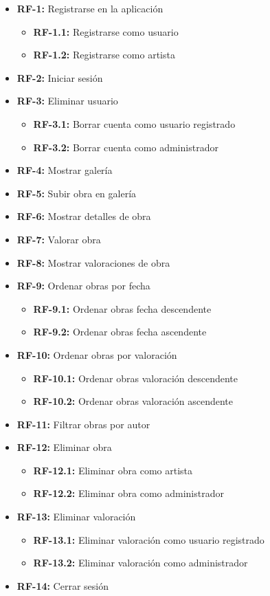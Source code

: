 \begin{itemize}
    \item \textbf{RF-1:} Registrarse en la aplicación
    \begin{itemize}
        \item \textbf{RF-1.1:} Registrarse como usuario
        \item \textbf{RF-1.2:} Registrarse como artista
    \end{itemize}
    \item \textbf{RF-2:} Iniciar sesión
    \item \textbf{RF-3:} Eliminar usuario
    \begin{itemize}
        \item \textbf{RF-3.1:} Borrar cuenta como usuario registrado
        \item \textbf{RF-3.2:} Borrar cuenta como administrador
    \end{itemize}
    \item \textbf{RF-4:} Mostrar galería
    \item \textbf{RF-5:} Subir obra en galería
    \item \textbf{RF-6:} Mostrar detalles de obra
    \item \textbf{RF-7:} Valorar obra
    \item \textbf{RF-8:} Mostrar valoraciones de obra
    \item \textbf{RF-9:} Ordenar obras por fecha
    \begin{itemize}
        \item \textbf{RF-9.1:} Ordenar obras fecha descendente
        \item \textbf{RF-9.2:} Ordenar obras fecha ascendente
    \end{itemize}
    \item \textbf{RF-10:} Ordenar obras por valoración
    \begin{itemize}
        \item \textbf{RF-10.1:} Ordenar obras valoración descendente
        \item \textbf{RF-10.2:} Ordenar obras valoración ascendente
    \end{itemize}
    \item \textbf{RF-11:} Filtrar obras por autor
    \item \textbf{RF-12:} Eliminar obra
    \begin{itemize}
        \item \textbf{RF-12.1:} Eliminar obra como artista
        \item \textbf{RF-12.2:} Eliminar obra como administrador
    \end{itemize}
    \item \textbf{RF-13:} Eliminar valoración
    \begin{itemize}
        \item \textbf{RF-13.1:} Eliminar valoración como usuario registrado
        \item \textbf{RF-13.2:} Eliminar valoración como administrador
    \end{itemize}
    \item \textbf{RF-14:} Cerrar sesión
\end{itemize}


